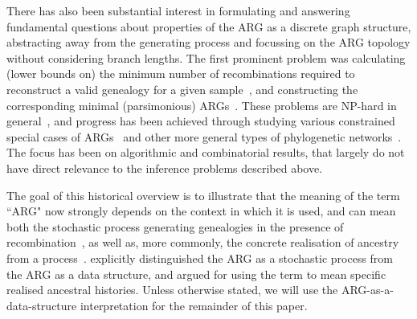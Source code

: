 \documentclass{article}
\begin{document}
There has also been substantial interest in formulating and answering
fundamental questions about properties
of the ARG as a discrete graph structure, abstracting away from the
generating process and focussing on the ARG topology without considering
branch lengths.
The first prominent problem was calculating (lower bounds on) the minimum number of
recombinations required to reconstruct a valid genealogy for a given
sample~\citep{myers2003bounds}, and constructing the corresponding
minimal (parsimonious)
ARGs~\citep{song2003parsimonious,song2005efficient,lyngso2005minimum}.
These problems are NP-hard in general~\citep{wang2001perfect}, and progress has
been achieved through studying various constrained special cases of ARGs~\citep[e.g.][]{gusfield2004optimal} and
other more general types of phylogenetic networks~\citep{huson2010phylogenetic}. The
focus has been on algorithmic and combinatorial results, that largely do not
have direct relevance to the inference problems described above.


The goal of this historical overview is to illustrate that the meaning of the term ``ARG" now strongly
depends on the context in which it is used, and can mean both the
stochastic process generating genealogies in the presence of
recombination~\citep[e.g.][]{nordborg2000linkage,birkner2013ancestral,
wilton2015smc,griffiths2016coalescent},
as well as, more commonly, the concrete realisation of ancestry from a
process~\citep[e.g.][]{gusfield2014recombinatorics,mathieson2020ancestry,brandt2021evaluation}.
\cite{minichiello2006mapping} explicitly distinguished the ARG as a
stochastic process from the ARG as a data structure, and
argued for using the term to mean specific realised ancestral histories.
Unless otherwise stated, we will use the ARG-as-a-data-structure
interpretation for the remainder of this paper.
\end{document}
